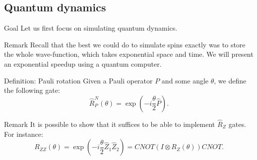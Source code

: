 \documentclass[a4paper]{article}
\begin{document}
\subsection{Quantum dynamics}

\begin{parag}{Goal}
    Let us first focus on simulating quantum dynamics.

    \begin{subparag}{Remark}
        Recall that the best we could do to simulate spins exactly was to store the whole wave-function, which takes exponential space and time. We will present an exponential speedup using a quantum computer.
    \end{subparag}
\end{parag}

\begin{parag}{Definition: Pauli rotation}
    Given a Pauli operator $P$ and some angle $\theta$, we define the following gate:
    \[\hat{R}_P^N\left(\theta\right) = \exp\left(-i \frac{\theta}{2} \hat{P}\right).\]

    \begin{subparag}{Remark}
        It is possible to show that it suffices to be able to implement $\hat{R}_Z$ gates. For instance: 
        \[R_{ZZ}\left(\theta\right) = \exp\left(-i \frac{\theta}{2} \hat{Z}_{1} \hat{Z}_2\right) = CNOT \left(I \otimes R_Z\left(\theta\right)\right) CNOT.\]
    \end{subparag}
\end{parag}
\end{document}
